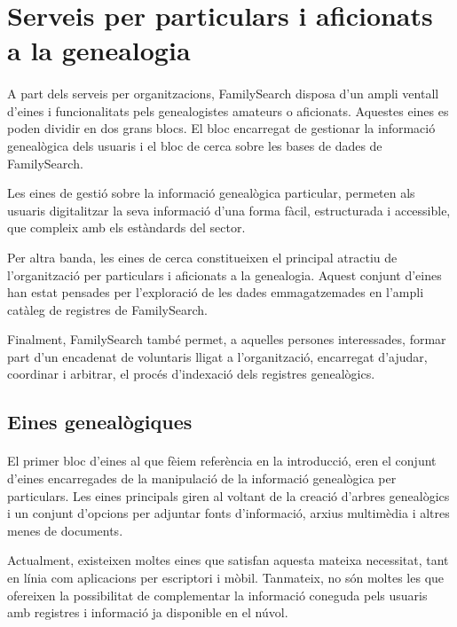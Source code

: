 \section{Serveis per particulars i aficionats a la genealogia}

    \paragraph{}
    A part dels serveis per organitzacions, FamilySearch disposa d'un ampli ventall d'eines i funcionalitats pels genealogistes amateurs o aficionats. Aquestes eines es poden dividir en dos grans blocs. El bloc encarregat de gestionar la informació genealògica dels usuaris i el bloc de cerca sobre les bases de dades de FamilySearch.

    Les eines de gestió sobre la informació genealògica particular, permeten als usuaris digitalitzar la seva informació d'una forma fàcil, estructurada i accessible, que com\-pleix amb els estàndards del sector.

    Per altra banda, les eines de cerca constitueixen el principal atractiu de l’or\-ga\-nit\-za\-ció per particulars i aficionats a la genealogia. Aquest conjunt d'eines han estat pensades per l’exploració de les dades emmagatzemades en l'ampli catàleg de registres de FamilySearch.

    Finalment, FamilySearch també permet, a aquelles persones interessades, formar part d'un encadenat de voluntaris lligat a l'organització, encarregat d'ajudar, coordinar i arbitrar, el procés d'indexació dels registres genealògics.


    \subsection{Eines genealògiques}

    \paragraph{}
    El primer bloc d'eines al que fèiem referència en la introducció, eren el conjunt d'eines encarregades de la manipulació de la informació genealògica per particulars. Les eines principals giren al voltant de la creació d’arbres genealògics i un conjunt d'opcions per adjuntar fonts d’informació, arxius multimèdia i altres menes de docu\-ments.

    Actualment, existeixen moltes eines que satisfan aquesta mateixa necessitat, tant en línia com aplicacions per escriptori i mòbil. Tanmateix, no són moltes les que ofereixen la possibilitat de complementar la informació coneguda pels usuaris amb re\-gis\-tres i informació ja disponible en el núvol.

